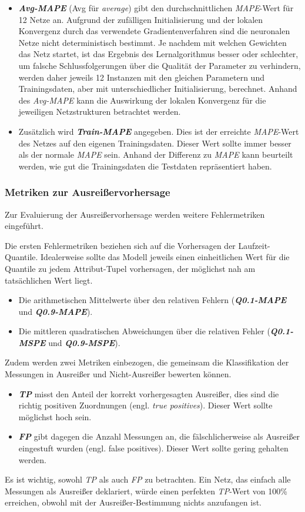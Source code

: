 \documentclass[
	12pt,
	a4paper,
	BCOR10mm,
	DIV14,
	listof=totoc,
	bibliography=totoc,
	headsepline
]{scrreprt}
\begin{document}
\begin{itemize}
	\item \textit{\textbf{Avg-MAPE}} (Avg für \textit{average}) gibt den durchschnittlichen \textit{MAPE}-Wert für 12 Netze an. 
	Aufgrund der zufälligen Initialisierung und der lokalen Konvergenz durch das verwendete Gradientenverfahren sind die neuronalen Netze nicht deterministisch bestimmt.
	Je nachdem mit welchen Gewichten das Netz startet, ist das Ergebnis des Lernalgorithmus besser oder schlechter, um falsche Schlussfolgerungen über die Qualität der Parameter zu verhindern, werden daher jeweils 12 Instanzen mit den gleichen Parametern und Trainingsdaten, aber mit unterschiedlicher Initialisierung, berechnet.
	Anhand des \textit{Avg-MAPE} kann die Auswirkung der lokalen Konvergenz für die jeweiligen Netzstrukturen betrachtet werden.
	\item Zusätzlich wird \textit{\textbf{Train-MAPE}} angegeben. Dies ist der erreichte \textit{MAPE}-Wert des Netzes auf den eigenen Trainingsdaten. Dieser Wert sollte immer besser als der normale \textit{MAPE} sein. Anhand der Differenz zu \textit{MAPE} kann beurteilt werden, wie gut die Trainingsdaten die Testdaten repräsentiert haben.
\end{itemize}

\subsubsection{Metriken zur Ausreißervorhersage}
Zur Evaluierung der Ausreißervorhersage werden weitere Fehlermetriken eingeführt.\medskip

Die ersten Fehlermetriken beziehen sich auf die Vorhersagen der Laufzeit-Quantile. Idealerweise sollte das Modell jeweils einen einheitlichen Wert für die Quantile zu jedem Attribut-Tupel vorhersagen, der möglichst nah am tatsächlichen Wert liegt.
\begin{itemize}
	\item Die arithmetischen Mittelwerte über den relativen Fehlern (\textit{\textbf{Q0.1-MAPE}} und \textit{\textbf{Q0.9-MAPE}}).
	\item Die mittleren quadratischen Abweichungen über die relativen Fehler (\textit{\textbf{Q0.1-MSPE}} und \textit{\textbf{Q0.9-MSPE}}).
\end{itemize}
Zudem werden zwei Metriken einbezogen, die gemeinsam die Klassifikation der Messungen in Ausreißer und Nicht-Ausreißer bewerten können.
\begin{itemize}
	\item \textit{\textbf{TP}} misst den Anteil der korrekt vorhergesagten Ausreißer, dies sind die richtig positiven Zuordnungen (engl. \textit{true positives}). Dieser Wert sollte möglichst hoch sein.
	\item \textit{\textbf{FP}} gibt dagegen die Anzahl Messungen an, die fälschlicherweise als Ausreißer eingestuft wurden (engl. false positives). Dieser Wert sollte gering gehalten werden.
\end{itemize}
Es ist wichtig, sowohl \textit{TP} als auch \textit{FP} zu betrachten. Ein Netz, das einfach alle Messungen als Ausreißer deklariert, würde einen perfekten \textit{TP}-Wert von 100\% erreichen, obwohl mit der Ausreißer-Bestimmung nichts anzufangen ist.
\end{document}
